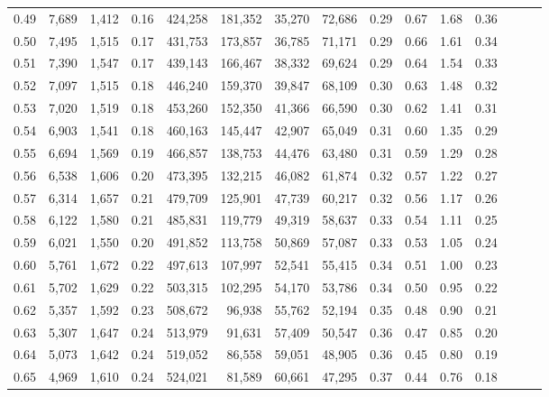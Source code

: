 \begin{tabular}{rrrrrrrrrrrrrrr}
0.49 &   7,689 &  1,412 &  0.16 &  424,258 &  181,352 &   35,270 &   72,686 &  0.29 &  0.67 &  1.68 &      0.36 \\
0.50 &   7,495 &  1,515 &  0.17 &  431,753 &  173,857 &   36,785 &   71,171 &  0.29 &  0.66 &  1.61 &      0.34 \\
0.51 &   7,390 &  1,547 &  0.17 &  439,143 &  166,467 &   38,332 &   69,624 &  0.29 &  0.64 &  1.54 &      0.33 \\
0.52 &   7,097 &  1,515 &  0.18 &  446,240 &  159,370 &   39,847 &   68,109 &  0.30 &  0.63 &  1.48 &      0.32 \\
0.53 &   7,020 &  1,519 &  0.18 &  453,260 &  152,350 &   41,366 &   66,590 &  0.30 &  0.62 &  1.41 &      0.31 \\
0.54 &   6,903 &  1,541 &  0.18 &  460,163 &  145,447 &   42,907 &   65,049 &  0.31 &  0.60 &  1.35 &      0.29 \\
0.55 &   6,694 &  1,569 &  0.19 &  466,857 &  138,753 &   44,476 &   63,480 &  0.31 &  0.59 &  1.29 &      0.28 \\
0.56 &   6,538 &  1,606 &  0.20 &  473,395 &  132,215 &   46,082 &   61,874 &  0.32 &  0.57 &  1.22 &      0.27 \\
0.57 &   6,314 &  1,657 &  0.21 &  479,709 &  125,901 &   47,739 &   60,217 &  0.32 &  0.56 &  1.17 &      0.26 \\
0.58 &   6,122 &  1,580 &  0.21 &  485,831 &  119,779 &   49,319 &   58,637 &  0.33 &  0.54 &  1.11 &      0.25 \\
0.59 &   6,021 &  1,550 &  0.20 &  491,852 &  113,758 &   50,869 &   57,087 &  0.33 &  0.53 &  1.05 &      0.24 \\
0.60 &   5,761 &  1,672 &  0.22 &  497,613 &  107,997 &   52,541 &   55,415 &  0.34 &  0.51 &  1.00 &      0.23 \\
0.61 &   5,702 &  1,629 &  0.22 &  503,315 &  102,295 &   54,170 &   53,786 &  0.34 &  0.50 &  0.95 &      0.22 \\
0.62 &   5,357 &  1,592 &  0.23 &  508,672 &   96,938 &   55,762 &   52,194 &  0.35 &  0.48 &  0.90 &      0.21 \\
0.63 &   5,307 &  1,647 &  0.24 &  513,979 &   91,631 &   57,409 &   50,547 &  0.36 &  0.47 &  0.85 &      0.20 \\
0.64 &   5,073 &  1,642 &  0.24 &  519,052 &   86,558 &   59,051 &   48,905 &  0.36 &  0.45 &  0.80 &      0.19 \\
0.65 &   4,969 &  1,610 &  0.24 &  524,021 &   81,589 &   60,661 &   47,295 &  0.37 &  0.44 &  0.76 &      0.18 \\

\end{tabular}
